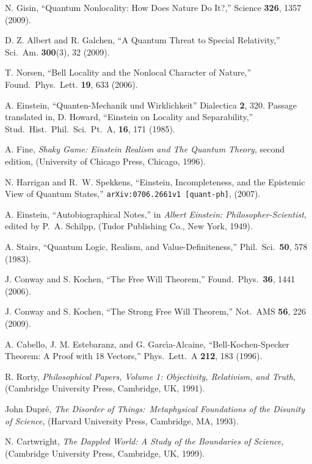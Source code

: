\begin{thebibliography}{100}
N. Gisin, ``Quantum Nonlocality: How Does Nature Do It?,'' Science {\bf 326}, 1357 (2009).

D. Z. Albert and R. Galchen, ``A Quantum Threat to Special Relativity,'' Sci.\ Am. {\bf 300}(3), 32 (2009).

T. Norsen, ``Bell Locality and the Nonlocal Character of Nature,'' Found.\ Phys.\ Lett. {\bf 19}, 633 (2006).

A. Einstein, ``Quanten-Mechanik und Wirklichkeit'' Dialectica {\bf 2}, 320. Passage translated in, D. Howard, ``Einstein on Locality and Separability,'' Stud.\ Hist.\ Phil.\ Sci.\ Pt.\ A, {\bf 16}, 171 (1985).

A. Fine, {\sl Shaky Game: Einstein Realism and The Quantum Theory}, second edition, (University of Chicago Press, Chicago, 1996).

N. Harrigan and R.~W. Spekkens, ``Einstein, Incompleteness, and the Epistemic View of Quantum States,'' {\tt arXiv:0706.2661v1 [quant-ph]}, (2007).

A. Einstein, ``Autobiographical Notes,'' in {\sl Albert Einstein: Philosopher-Scientist}, edited by P.~A. Schilpp, (Tudor Publishing Co., New York, 1949).

A. Stairs, ``Quantum Logic, Realism, and Value-Definiteness,'' Phil.\ Sci.\ {\bf 50},  578  (1983).

J. Conway and S. Kochen, ``The Free Will Theorem,'' Found.\ Phys.\ {\bf 36}, 1441 (2006).

J. Conway and S. Kochen, ``The Strong Free Will Theorem,'' Not.\ AMS {\bf 56}, 226 (2009).

A. Cabello, J. M. Estebaranz, and G. Garc\'{\i}a-Alcaine, ``Bell-Kochen-Specker Theorem: A Proof with 18 Vectors,'' Phys.\ Lett.\ A {\bf 212}, 183 (1996).

R. Rorty, {\sl Philosophical Papers, Volume 1: Objectivity, Relativism, and Truth}, (Cambridge University Press, Cambridge, UK, 1991).

John Dupr\'e, {\sl The Disorder of Things:\ Metaphysical Foundations of the Disunity of Science}, (Harvard University Press, Cambridge, MA, 1993).

N. Cartwright, {\sl The Dappled World: A Study of the Boundaries of Science}, (Cambridge University Press, Cambridge, UK, 1999).


\end{thebibliography}
